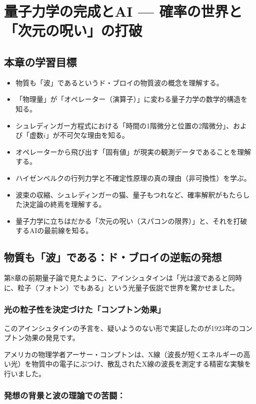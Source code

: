 \chapter{量子力学の完成とAI --- 確率の世界と「次元の呪い」の打破}

\section*{本章の学習目標}
\begin{itemize}
\item 物質も「波」であるというド・ブロイの物質波の概念を理解する。
\item 「物理量」が「オペレーター（演算子）」に変わる量子力学の数学的構造を知る。
\item シュレディンガー方程式における「時間の1階微分と位置の2階微分」、および「虚数\(i\)」が不可欠な理由を知る。
\item オペレーターから飛び出す「固有値」が現実の観測データであることを理解する。
\item ハイゼンベルクの行列力学と不確定性原理の真の理由（非可換性）を学ぶ。
\item 波束の収縮、シュレディンガーの猫、量子もつれなど、確率解釈がもたらした決定論の終焉を理解する。
\item 量子力学に立ちはだかる「次元の呪い（スパコンの限界）」と、それを打破するAIの最前線を知る。
\end{itemize}

\section{物質も「波」である：ド・ブロイの逆転の発想}

第8章の前期量子論で見たように、アインシュタインは「光は波であると同時に、粒子（フォトン）でもある」という光量子仮説で世界を驚かせました。

\subsection{光の粒子性を決定づけた「コンプトン効果」}

このアインシュタインの予言を、疑いようのない形で実証したのが1923年のコンプトン効果の発見です。

アメリカの物理学者アーサー・コンプトンは、X線（波長が短くエネルギーの高い光）を物質中の電子にぶつけ、散乱されたX線の波長を測定する精密な実験を行いました。

\subsection{発想の背景と波の理論での苦闘：}

